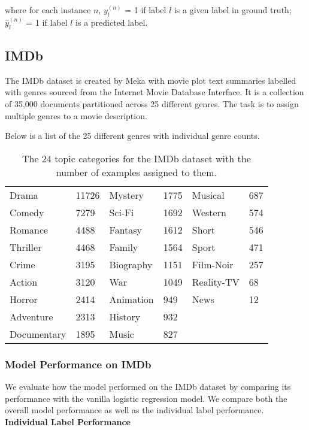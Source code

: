 \noindent where for each instance $n$, $y^{(n)}_{l}$ = 1 if label $l$ is a given label in ground truth; \\
$\hat{y}^{(n)}_{l}$ = 1 if label $l$ is a predicted label.
\newpage
\subsection{IMDb}

The IMDb dataset is created by Meka with movie plot text summaries labelled with genres sourced from the Internet Movie Database Interface. It is a collection of 35,000 documents partitioned across 25 different genres. The task is to assign multiple genres to a movie description.

Below is a list of the 25 different genres with individual genre counts.

\begin{table}[htbp]
\centering
\begin{tabular}{ll|ll|ll}
Drama & 11726 & Mystery & 1775 & Musical & 687 \\
Comedy & 7279 & Sci-Fi & 1692 & Western & 574 \\
Romance & 4488 & Fantasy & 1612 & Short & 546 \\
Thriller & 4468 & Family & 1564 & Sport & 471 \\
Crime & 3195 & Biography & 1151 & Film-Noir & 257 \\
Action & 3120 & War & 1049 & Reality-TV & 68 \\
Horror & 2414 & Animation & 949 & News & 12 \\
Adventure & 2313 & History & 932 &  &  \\
Documentary & 1895 & Music & 827 &  & 
\end{tabular}
\caption{\label{tab:widgets}The 24 topic categories for the IMDb dataset with the number of examples assigned to them.}
\end{table}

\subsubsection{Model Performance on IMDb}

We evaluate how the model performed on the IMDb dataset by comparing its performance with the vanilla logistic regression model. We compare both the overall model performance as well as the individual label performance.\\

\noindent \textbf{Individual Label Performance}\\

